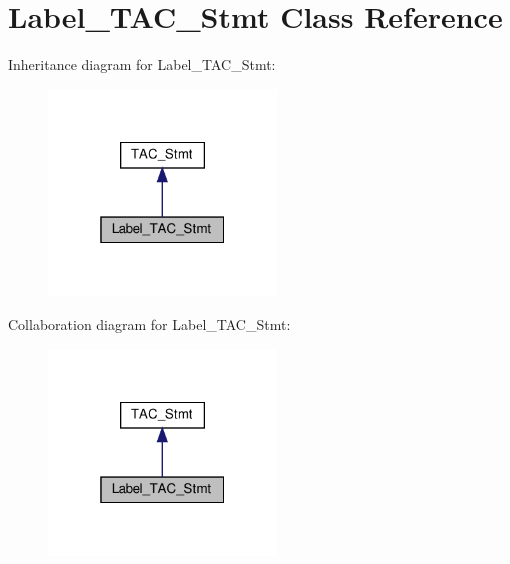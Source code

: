 \hypertarget{classLabel__TAC__Stmt}{}\section{Label\+\_\+\+T\+A\+C\+\_\+\+Stmt Class Reference}
\label{classLabel__TAC__Stmt}


Inheritance diagram for Label\+\_\+\+T\+A\+C\+\_\+\+Stmt\+:
\nopagebreak
\begin{figure}[H]
\begin{center}
\leavevmode
\includegraphics[width=172pt]{classLabel__TAC__Stmt__inherit__graph}
\end{center}
\end{figure}


Collaboration diagram for Label\+\_\+\+T\+A\+C\+\_\+\+Stmt\+:
\nopagebreak
\begin{figure}[H]
\begin{center}
\leavevmode
\includegraphics[width=172pt]{classLabel__TAC__Stmt__coll__graph}
\end{center}
\end{figure}
